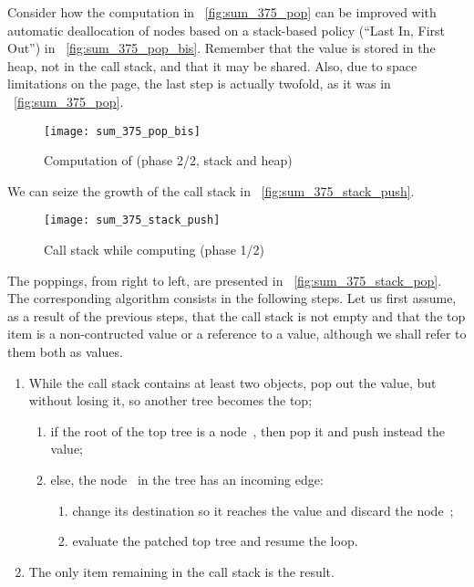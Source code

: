 Consider how the computation in \fig~\vref{fig:sum_375_pop} can be
improved with automatic deallocation of nodes based on a
stack\hyp{}based policy (``Last In, First Out'') in
\fig~\vref{fig:sum_375_pop_bis}. Remember that the value
\erlcode{[3,7,5]} is stored in the heap, not in the call stack, and
that it may be shared. Also, due to space limitations on the page, the
last step is actually twofold, as it was in
\fig~\vref{fig:sum_375_pop}.
\begin{figure}[t]
\centering
\texttt{[image: sum\_375\_pop\_bis]}
\caption{Computation of  (phase 2/2, stack and heap)
\label{fig:sum_375_pop_bis}}
\end{figure}
We can seize the growth of the call stack in
\fig~\vref{fig:sum_375_stack_push}.
\begin{figure}[b]
\centering
\texttt{[image: sum\_375\_stack\_push]}
\caption{Call stack while computing  (phase 1/2)
\label{fig:sum_375_stack_push}}
\end{figure}
The poppings, from right to left, are presented in
\fig~\vref{fig:sum_375_stack_pop}. The corresponding algorithm
consists in the following steps. Let us first assume, as a result of
the previous steps, that the call stack is not empty and that the top
item is a non\hyp{}contructed value or a reference to a value,
although we shall refer to them both as values.
\begin{enumerate}

  \item While the call stack contains at least two objects, pop out
    the value, but without losing it, so another tree becomes the top;
    \begin{enumerate}
      
    \item if the root of the top tree is a node~, then
      pop it and push instead the value;
      
    \item else, the node~ in the tree has an incoming
      edge:
      \begin{enumerate}
        
      \item change its destination so it reaches the value and discard
        the node~;
        
      \item evaluate the patched top tree and resume the loop.
        
      \end{enumerate}
      
    \end{enumerate}
    
  \item The only item remaining in the call stack is the result.
    
\end{enumerate}
